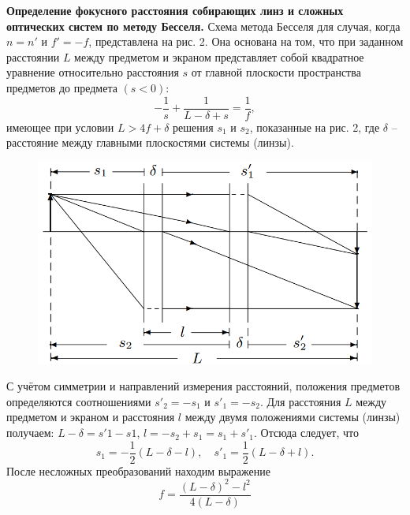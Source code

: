 \documentclass[12pt]{article}
\begin{document}
    \textbf{Определение фокусного расстояния собирающих линз и сложных
    оптических систем по методу Бесселя.}
    Схема метода Бесселя для случая, когда $n = n'$ и $f' = -f$, представлена на рис. 2.
    Она основана на том, что при заданном расстоянии
    $L$ между предметом и экраном представляет собой
    квадратное уравнение относительно расстояния $s$ от главной плоскости пространства предметов до предмета $(s < 0)$:
    \[-\frac{1}{s}+\frac{1}{L-\delta+s} = \frac{1}{f},\]
    имеющее при условии $L > 4f +\delta$ решения $s_1$ и $s_2$, показанные на рис. 2,
    где $\delta$ -- расстояние между главными плоскостями системы (линзы).
    \begin{figure}[h]
        \centering
        \includegraphics[width=0.6\linewidth]{pic/2}
        \caption{}
        \label{fig:2}
    \end{figure}

    С учётом симметрии и направлений измерения расстояний,
    положения предметов определяются соотношениями $s'_2 = -s_1$ и $s'_1 = -s_2$.
    Для расстояния $L$ между предметом и экраном и расстояния $l$ между двумя положениями системы (линзы)
    получаем: $L - \delta = s'1 - s1$, $l = -s_2 + s_1 = s_1 + s'_1$.
    Отсюда следует, что
    \[s_1 = -\frac{1}{2}(L-\delta-l),\quad s'_1=\frac{1}{2}(L - \delta + l).\]
    После несложных преобразований находим выражение
    \[f = \frac{(L-\delta)^2 - l^2}{4(L  - \delta)}\]
\end{document}
